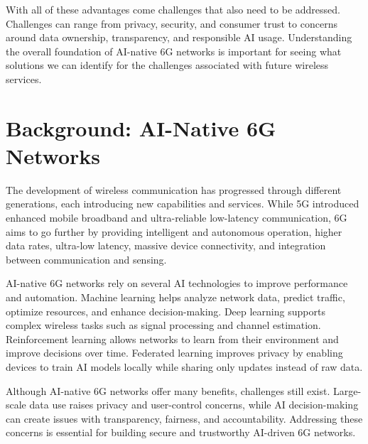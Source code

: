 With all of these advantages come challenges that also need to be addressed.
Challenges can range from privacy, security, and consumer trust to concerns around
data ownership, transparency, and responsible AI usage. Understanding the overall
foundation of AI-native 6G networks is important for seeing what solutions we can
identify for the challenges associated with future wireless services.



\section{Background: AI-Native 6G Networks}

The development of wireless communication has progressed through different generations,
each introducing new capabilities and services. While 5G introduced enhanced mobile
broadband and ultra-reliable low-latency communication, 6G aims to go further by
providing intelligent and autonomous operation, higher data rates, ultra-low latency,
massive device connectivity, and integration between communication and sensing.

AI-native 6G networks rely on several AI technologies to improve performance and
automation. Machine learning helps analyze network data, predict traffic, optimize
resources, and enhance decision-making. Deep learning supports complex wireless tasks
such as signal processing and channel estimation. Reinforcement learning allows
networks to learn from their environment and improve decisions over time. Federated
learning improves privacy by enabling devices to train AI models locally while
sharing only updates instead of raw data.

Although AI-native 6G networks offer many benefits, challenges still exist. Large-scale
data use raises privacy and user-control concerns, while AI decision-making can create
issues with transparency, fairness, and accountability. Addressing these concerns is
essential for building secure and trustworthy AI-driven 6G networks.



